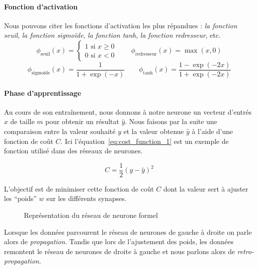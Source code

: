 \paragraph{Fonction d'activation}
Nous pouvons citer les fonctions d'activation les plus répandues : \textit{la fonction seuil}, \textit{la fonction sigmo\"ide}, \textit{la fonction tanh}, \textit{la fonction redresseur}, etc.
\begin{equation}
	\phi_\text{seuil}(x) =
	\begin{cases}
		1 \text{ si } x \geq 0 \\
		0 \text{ si } x < 0
	\end{cases} \qquad
	\phi_\text{redresseur}(x) = \max(x, 0)
\end{equation}
\begin{equation}
	\phi_\text{sigmo\"ide}(x) = \frac{1}{1+\exp(-x)} \qquad
	\phi_\text{tanh}(x) = \frac{1-\exp(-2x)}{1+\exp(-2x)}
\end{equation}

\paragraph{Phase d'apprentissage}
Au cours de son entraînement, nous donnons à notre neurone un vecteur d'entrés $x$ de taille $m$ pour obtenir un résultat $\hat y$.
Nous faisons par la suite une comparaison entre la valeur souhaité $y$ et la valeur obtenue $\hat y$ à l'aide d'une fonction de coût $C$.
Ici l'équation~\ref{eq:cost_function_1} est un exemple de fonction utilisé dans des réseaux de neurones.

\begin{equation}
	\label{eq:cost_function_1} C = \frac{1}{2}(y-\hat y)^2
\end{equation}

L'objectif est de minimiser cette fonction de coût $C$ dont la valeur sert à ajuster les ``poids'' $w$ sur les différents synapses.
\begin{figure}[ht]	
	\centering
	\caption{Représentation du réseau de neurone formel}
\end{figure}
Lorsque les données parcourent le réseau de neurones de gauche à droite on parle alors de \textit{propagation}.
Tandis que lors de l'ajustement des poids, les données remontent le réseau de neurones de droite à gauche et nous parlons alors de \textit{retro-propagation}.

